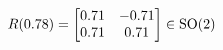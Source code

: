\documentclass[preview]{standalone}
\begin{document}
\begin{align*}
\special{dvisvgm:raw <g id='unique000'>}R(0.78) = \begin{bmatrix} 0.71 & -0.71 \\ 0.71 & 0.71 \end{bmatrix} \in \text{SO}(2)\special{dvisvgm:raw </g>}
\end{align*}
\end{document}
